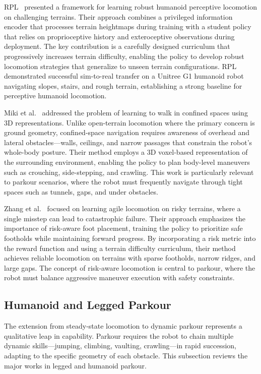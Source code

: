 RPL~\cite{zhang2024rpl} presented a framework for learning robust humanoid perceptive locomotion on challenging terrains. Their approach combines a privileged information encoder that processes terrain heightmaps during training with a student policy that relies on proprioceptive history and exteroceptive observations during deployment. The key contribution is a carefully designed curriculum that progressively increases terrain difficulty, enabling the policy to develop robust locomotion strategies that generalize to unseen terrain configurations. RPL demonstrated successful sim-to-real transfer on a Unitree G1 humanoid robot navigating slopes, stairs, and rough terrain, establishing a strong baseline for perceptive humanoid locomotion.

Miki et al.~\cite{miki2024confinedspaces} addressed the problem of learning to walk in confined spaces using 3D representations. Unlike open-terrain locomotion where the primary concern is ground geometry, confined-space navigation requires awareness of overhead and lateral obstacles---walls, ceilings, and narrow passages that constrain the robot's whole-body posture. Their method employs a 3D voxel-based representation of the surrounding environment, enabling the policy to plan body-level maneuvers such as crouching, side-stepping, and crawling. This work is particularly relevant to parkour scenarios, where the robot must frequently navigate through tight spaces such as tunnels, gaps, and under obstacles.

Zhang et al.~\cite{zhang2024riskyterrain} focused on learning agile locomotion on risky terrains, where a single misstep can lead to catastrophic failure. Their approach emphasizes the importance of risk-aware foot placement, training the policy to prioritize safe footholds while maintaining forward progress. By incorporating a risk metric into the reward function and using a terrain difficulty curriculum, their method achieves reliable locomotion on terrains with sparse footholds, narrow ridges, and large gaps. The concept of risk-aware locomotion is central to parkour, where the robot must balance aggressive maneuver execution with safety constraints.

\subsection{Humanoid and Legged Parkour}

The extension from steady-state locomotion to dynamic parkour represents a qualitative leap in capability. Parkour requires the robot to chain multiple dynamic skills---jumping, climbing, vaulting, crawling---in rapid succession, adapting to the specific geometry of each obstacle. This subsection reviews the major works in legged and humanoid parkour.

